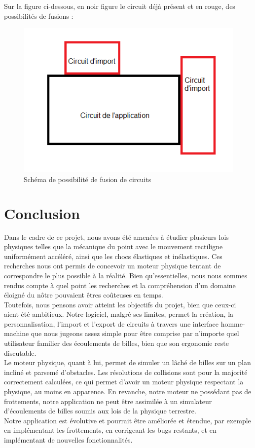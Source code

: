 \documentclass{report}
\begin{document}
Sur la figure ci-dessous, en noir figure le circuit déjà présent et en rouge, des possibilités de fusions  :

\begin{figure}[H]
\centering
\includegraphics[scale=1.0]{fusioncircuits.png}
\caption{Schéma de possibilité de fusion de circuits}
\end{figure}

\chapter{Conclusion}

Dans le cadre de ce projet, nous avons été amenées à étudier plusieurs lois physiques telles que la mécanique du point avec le mouvement rectiligne uniformément accéléré, ainsi que les chocs élastiques et inélastiques. Ces recherches nous ont permis de concevoir un moteur physique tentant de correspondre le plus possible à la réalité. Bien qu’essentielles, nous nous sommes rendus compte à quel point les recherches et la compréhension d’un domaine éloigné du nôtre pouvaient êtres coûteuses en temps. \\

Toutefois, nous pensons avoir atteint les objectifs du projet, bien que ceux-ci aient été ambitieux. Notre logiciel, malgré ses limites, permet la création, la personnalisation, l’import et l’export de circuits à travers une interface homme-machine que nous jugeons assez simple pour être comprise par n’importe quel utilisateur familier des écoulements de billes, bien que son ergonomie reste discutable. \\

Le moteur physique, quant à lui, permet de simuler un lâché de billes sur un plan incliné et parsemé d’obstacles. Les résolutions de collisions sont pour la majorité correctement calculées, ce qui permet d’avoir un moteur physique respectant la physique, au moins en apparence.
En revanche, notre moteur ne possédant pas de frottements, notre application ne peut être assimilée à un simulateur d’écoulements de billes soumis aux lois de la physique terrestre. \\

Notre application est évolutive et pourrait être améliorée et étendue, par exemple en implémentant les frottements, en corrigeant les bugs restants, et en implémentant de nouvelles fonctionnalités.



\end{document}
